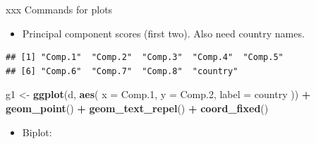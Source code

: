 \documentclass[ignorenonframetext,]{beamer}
\newenvironment{Shaded}{\begin{snugshade}}{\end{snugshade}}
\newcommand{\DataTypeTok}[1]{\textcolor[rgb]{0.13,0.29,0.53}{#1}}
\newcommand{\FloatTok}[1]{\textcolor[rgb]{0.00,0.00,0.81}{#1}}
\newcommand{\KeywordTok}[1]{\textcolor[rgb]{0.13,0.29,0.53}{\textbf{#1}}}
\newcommand{\NormalTok}[1]{#1}
\newcommand{\OperatorTok}[1]{\textcolor[rgb]{0.81,0.36,0.00}{\textbf{#1}}}
\newcommand{\StringTok}[1]{\textcolor[rgb]{0.31,0.60,0.02}{#1}}
\providecommand{\tightlist}{%
  \setlength{\itemsep}{0pt}\setlength{\parskip}{0pt}}
\begin{document}
\begin{frame}[fragile]{xxx Commands for plots}
\protect\hypertarget{xxx-commands-for-plots}{}

\begin{itemize}
\tightlist
\item
  Principal component scores (first two). Also need country names.
\end{itemize}

\begin{Shaded}
\end{Shaded}

\begin{verbatim}
## [1] "Comp.1"  "Comp.2"  "Comp.3"  "Comp.4"  "Comp.5" 
## [6] "Comp.6"  "Comp.7"  "Comp.8"  "country"
\end{verbatim}

\begin{Shaded}
\begin{Highlighting}[]
\NormalTok{g1 <-}\StringTok{ }\KeywordTok{ggplot}\NormalTok{(d, }\KeywordTok{aes}\NormalTok{(}
  \DataTypeTok{x =}\NormalTok{ Comp}\FloatTok{.1}\NormalTok{, }\DataTypeTok{y =}\NormalTok{ Comp}\FloatTok{.2}\NormalTok{,}
  \DataTypeTok{label =}\NormalTok{ country}
\NormalTok{)) }\OperatorTok{+}
\StringTok{  }\KeywordTok{geom_point}\NormalTok{() }\OperatorTok{+}\StringTok{ }\KeywordTok{geom_text_repel}\NormalTok{() }\OperatorTok{+}
\StringTok{  }\KeywordTok{coord_fixed}\NormalTok{()}
\end{Highlighting}
\end{Shaded}

\begin{itemize}
\tightlist
\item
  Biplot:
\end{itemize}

\begin{Shaded}
\end{Shaded}

\end{frame}
\end{document}
